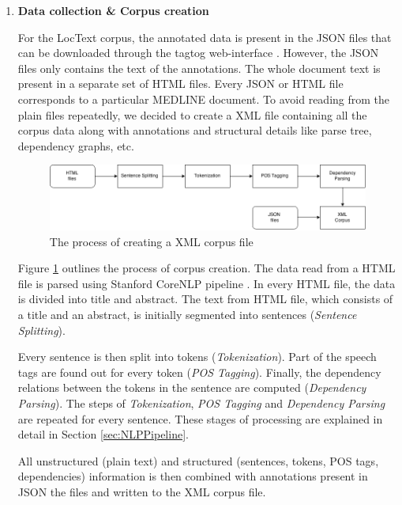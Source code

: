 \begin{enumerate}

\item \textbf{Data collection \& Corpus creation}

For the LocText corpus, the annotated data is present in the JSON files that can be downloaded through the tagtog web-interface \cite{cejuela2014tagtog}. However, the JSON files only contains the text of the annotations. The whole document text is present in a separate set of HTML files. Every JSON or HTML file corresponds to a particular MEDLINE \cite{medline} document. To avoid reading from the plain files repeatedly, we decided to create a XML file containing all the corpus data along with annotations and structural details like parse tree, dependency graphs, etc.

\begin{figure}
\centering
\includegraphics[scale=0.4]{figures/Corpus_Creation.png}
\caption{The process of creating a XML corpus file}\label{fig:corpusCreation}
\end{figure}

Figure \ref{fig:corpusCreation} outlines the process  of corpus creation. The data read from a HTML file is parsed using Stanford CoreNLP pipeline \cite{manning2014stanford}. In every HTML file, the data is divided into title and abstract. The text from HTML file, which consists of a title and an abstract, is initially segmented into sentences (\textit{Sentence Splitting}). 

Every sentence is then split into tokens (\textit{Tokenization}). Part of the speech tags are found out for every token (\textit{POS Tagging}). Finally, the dependency relations between the tokens in the sentence are computed (\textit{Dependency Parsing}). The steps of \textit{Tokenization}, \textit{POS Tagging} and \textit{Dependency Parsing} are repeated for every sentence. These stages of processing are explained in detail in Section \ref{sec:NLPPipeline}.

All unstructured (plain text) and structured (sentences, tokens, POS tags, dependencies) information is then combined with annotations present in JSON the files and written to the XML corpus file.


\end{enumerate}
